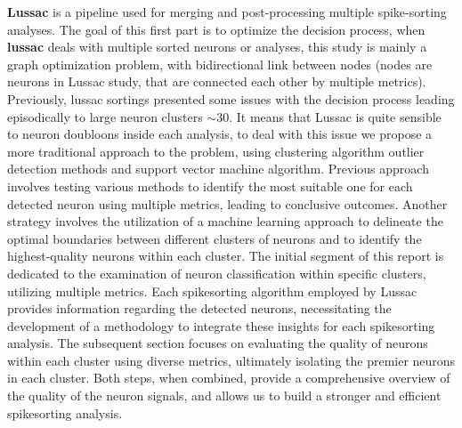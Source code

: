 \documentclass[11pt,a4paper]{report}
\begin{document}
\begin{center}
\begin{minipage}{.75\linewidth}
        \textbf{Lussac}\cite{Lussac} is a pipeline used for merging and post-processing multiple spike-sorting analyses.
        The goal of this first part is to optimize the decision process, when \textbf{lussac} deals with multiple sorted neurons or analyses, this study is mainly a graph optimization problem,
        with bidirectional link between nodes (nodes are neurons in Lussac study, that are connected each other by multiple metrics).
        Previously, lussac sortings presented some issues with the decision process leading episodically to large neuron clusters $\sim 30$. It means that Lussac is quite sensible to neuron doubloons inside each analysis, to deal with this issue we propose a more traditional approach to the problem, using clustering algorithm outlier detection methods and support vector machine algorithm.
        Previous approach involves testing various methods to identify the most suitable one for each detected neuron using multiple metrics, leading to conclusive outcomes. Another strategy involves the utilization of a machine learning approach to delineate the optimal boundaries between different clusters of neurons and to identify the highest-quality neurons within each cluster.
        The initial segment of this report is dedicated to the examination of neuron classification within specific clusters, utilizing multiple metrics. Each spikesorting algorithm employed by Lussac provides information regarding the detected neurons, necessitating the development of a methodology to integrate these insights for each spikesorting analysis. The subsequent section focuses on evaluating the quality of neurons within each cluster using diverse metrics, ultimately isolating the premier neurons in each cluster.
        Both steps, when combined, provide a comprehensive overview of the quality of the neuron signals, and allows us to build a stronger and efficient spikesorting analysis.

    \end{minipage}
\end{center}
\newpage
\fontsize{12}{13}\selectfont
\end{document}
